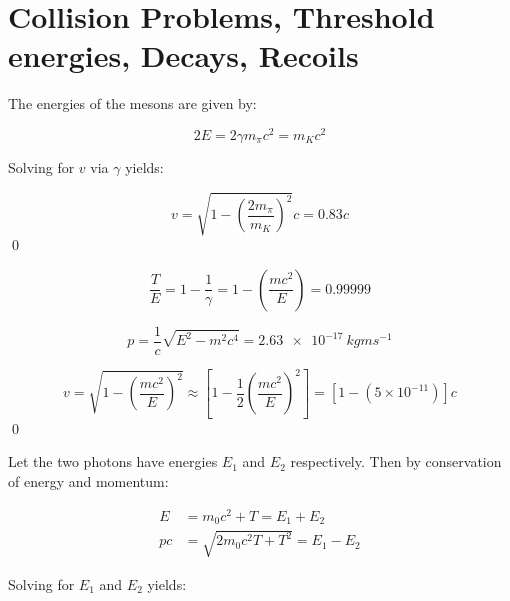 \documentclass[12pt]{article}
\begin{document}



\pagebreak
\section*{Collision Problems, Threshold energies, Decays, Recoils}


The energies of the mesons are given by:

\begin{equation}
    2E = 2\gamma m_{\pi} c^{2} = m_{K} c^{2}
\end{equation}

Solving for $v$ via $\gamma$ yields:

\begin{equation}
    v = \sqrt{1 - \left( \frac{2m_{\pi}}{m_{K}} \right)^{2}} c = 0.83c
\end{equation}
\qed




\begin{equation}
    \frac{T}{E} = 1 - \frac{1}{\gamma} = 1 - \left( \frac{mc^{2}}{E} \right) = 0.99999
\end{equation}


\begin{equation}
    p = \frac{1}{c} \sqrt{E^{2} - m^{2} c^{4}} = \qty{2.63e-17}{kg m s^{-1}}
\end{equation}


\begin{equation}
    v = \sqrt{1 - \left( \frac{mc^{2}}{E} \right)^{2}} \approx \left[ 1 - \frac{1}{2} \left( \frac{mc^{2}}{E} \right)^{2} \right] = \left[ 1 - (5 \times 10^{-11}) \right]c
\end{equation}
\qed


Let the two photons have energies $E_{1}$ and $E_{2}$ respectively. Then by conservation of energy and momentum:

\begin{equation}
\begin{split}
    E &= m_{0}c^{2} + T = E_{1} + E_{2} \\
    pc &= \sqrt{2m_{0}c^{2}T + T^{2}} = E_{1} - E_{2}
\end{split}
\end{equation}

Solving for $E_{1}$ and $E_{2}$ yields:
\end{document}
